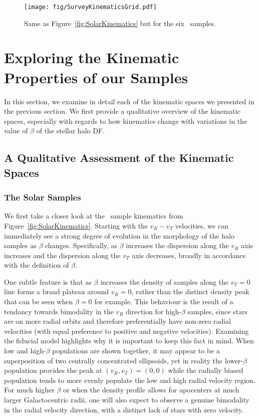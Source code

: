 \begin{figure*}
	\centering
	\texttt{[image: fig/SurveyKinematicsGrid.pdf]}
	\caption{Same as Figure~\ref{fig:SolarKinematics} but for the six \survey\ samples.}
	\label{fig:SurveyKinematics}
\end{figure*}

\section{Exploring the Kinematic Properties of our Samples}

In this section, we examine in detail each of the kinematic spaces we presented in the previous section. We first provide a qualitative overview of the kinematic spaces, especially with regards to how kinematics change with variations in the value of $\beta$ of the stellar halo DF. 

\subsection{A Qualitative Assessment of the Kinematic Spaces}

\subsubsection{The Solar Samples}

We first take a closer look at the \solar\ sample kinematics from Figure~\ref{fig:SolarKinematics}. Starting with the $v_{R}-v_{T}$ velocities, we can immediately see a strong degree of evolution in the morphology of the halo samples as $\beta$ changes. Specifically, as $\beta$ increases the dispersion along the $v_{R}$ axis increases and the dispersion along the $v_{T}$ axis decreases, broadly in accordance with the definition of $\beta$. 

One subtle feature is that as $\beta$ increases the density of samples along the $v_{T}=0$ line forms a broad plateau around $v_{R}=0$, rather than the distinct density peak that can be seen when $\beta=0$ for example. This behaviour is the result of a tendancy towards bimodality in the $v_{R}$ direction for high-$\beta$ samples, since stars are on more radial orbits and therefore preferentially have non-zero radial velocities (with equal preference to positive and negative velocities). Examining the fiducial model highlights why it is important to keep this fact in mind. When low and high-$\beta$ populations are shown together, it may appear to be a superposition of two centrally concentrated ellipsoids, yet in reality the lower-$\beta$ population provides the peak at $(v_{R},v_{T}) = (0,0)$ while the radially biased population tends to more evenly populate the low and high radial velocity region. For much higher $\beta$ or when the density profile allows for apocenters at much larger Galactocentric radii, one will also expect to observe a genuine bimodality in the radial velocity direction, with a distinct lack of stars with zero velocity. 

